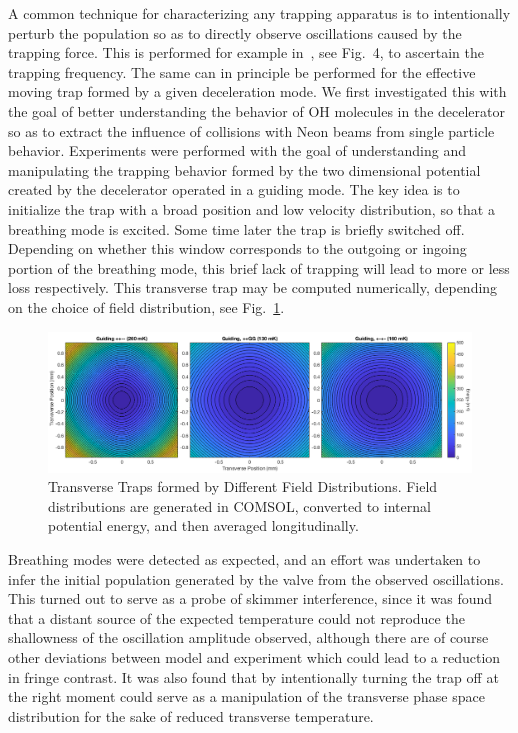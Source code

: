 A common technique for characterizing any trapping apparatus is to intentionally perturb the population so as to directly observe oscillations caused by the trapping force. 
This is performed for example in~\cite{stuhl2012uwave}, see Fig.~4, to ascertain the trapping frequency.
The same can in principle be performed for the effective moving trap formed by a given deceleration mode.
We first investigated this with the goal of better understanding the behavior of OH molecules in the decelerator so as to extract the influence of collisions with Neon beams from single particle behavior.
Experiments were performed with the goal of understanding and manipulating the trapping behavior formed by the two dimensional potential created by the decelerator operated in a guiding mode.
The key idea is to initialize the trap with a broad position and low velocity distribution, so that a breathing mode is excited.
Some time later the trap is briefly switched off.
Depending on whether this window corresponds to the outgoing or ingoing portion of the breathing mode, this brief lack of trapping will lead to more or less loss respectively.
This transverse trap may be computed numerically, depending on the choice of field distribution, see Fig.~\ref{fig:guiding_compilation}.

\begin{figure}[t!]
\includegraphics[width=\linewidth]{Slowing/guiding_compilation.png}
\caption[Transverse Guiding Potentials]{\label{fig:guiding_compilation}
Transverse Traps formed by Different Field Distributions. Field distributions are generated in COMSOL, converted to internal potential energy, and then averaged longitudinally.}
\end{figure}

Breathing modes were detected as expected, and an effort was undertaken to infer the initial population generated by the valve from the observed oscillations.
This turned out to serve as a probe of skimmer interference, since it was found that a distant source of the expected temperature could not reproduce the shallowness of the oscillation amplitude observed, although there are of course other deviations between model and experiment which could lead to a reduction in fringe contrast.
It was also found that by intentionally turning the trap off at the right moment could serve as a manipulation of the transverse phase space distribution for the sake of reduced transverse temperature.

